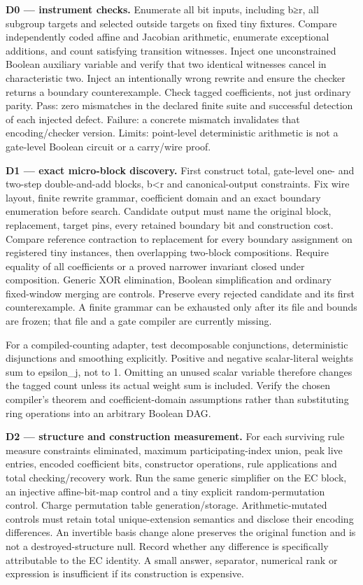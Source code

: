 \documentclass[
  10pt,
]{article}
\begin{document}
\textbf{D0 --- instrument checks.} Enumerate all bit inputs, including
b≥r, all subgroup targets and selected outside targets on fixed tiny
fixtures. Compare independently coded affine and Jacobian arithmetic,
enumerate exceptional additions, and count satisfying transition
witnesses. Inject one unconstrained Boolean auxiliary variable and
verify that two identical witnesses cancel in characteristic two. Inject
an intentionally wrong rewrite and ensure the checker returns a boundary
counterexample. Check tagged coefficients, not just ordinary parity.
Pass: zero mismatches in the declared finite suite and successful
detection of each injected defect. Failure: a concrete mismatch
invalidates that encoding/checker version. Limits: point-level
deterministic arithmetic is not a gate-level Boolean circuit or a
carry/wire proof.

\textbf{D1 --- exact micro-block discovery.} First construct total,
gate-level one- and two-step double-and-add blocks, b\textless r and
canonical-output constraints. Fix wire layout, finite rewrite grammar,
coefficient domain and an exact boundary enumeration before search.
Candidate output must name the original block, replacement, target pins,
every retained boundary bit and construction cost. Compare reference
contraction to replacement for every boundary assignment on registered
tiny instances, then overlapping two-block compositions. Require
equality of all coefficients or a proved narrower invariant closed under
composition. Generic XOR elimination, Boolean simplification and
ordinary fixed-window merging are controls. Preserve every rejected
candidate and its first counterexample. A finite grammar can be
exhausted only after its file and bounds are frozen; that file and a
gate compiler are currently missing.

For a compiled-counting adapter, test decomposable conjunctions,
deterministic disjunctions and smoothing explicitly. Positive and
negative scalar-literal weights sum to epsilon\_j, not to 1. Omitting an
unused scalar variable therefore changes the tagged count unless its
actual weight sum is included. Verify the chosen compiler's theorem and
coefficient-domain assumptions rather than substituting ring operations
into an arbitrary Boolean DAG.

\textbf{D2 --- structure and construction measurement.} For each
surviving rule measure constraints eliminated, maximum
participating-index union, peak live entries, encoded coefficient bits,
constructor operations, rule applications and total checking/recovery
work. Run the same generic simplifier on the EC block, an injective
affine-bit-map control and a tiny explicit random-permutation control.
Charge permutation table generation/storage. Arithmetic-mutated controls
must retain total unique-extension semantics and disclose their encoding
differences. An invertible basis change alone preserves the original
function and is not a destroyed-structure null. Record whether any
difference is specifically attributable to the EC identity. A small
answer, separator, numerical rank or expression is insufficient if its
construction is expensive.
\end{document}
